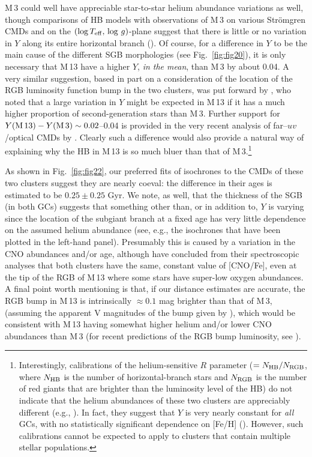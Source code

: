 \documentclass[12pt,preprint]{aastex}
\newcommand\teff{{T_{\rm eff}}}
\begin{document}
M$\,$3 could well have appreciable star-to-star helium abundance variations as
well, though comparisons of HB models with observations of M$\,$3 on various
Str\"omgren CMDs and on the $(\log\teff,\,\log\,g)$-plane suggest that there is
little or no variation in $Y$ along its entire horizontal branch
(\citealt{cgs09}).  Of course, for a difference in $Y$ to be the main cause of
the different SGB morphologies (see Fig.~\ref{fig:fig20}), it is only necessary
that M$\,$13 have a higher $Y$, {\it in the mean}, than M$\,$3 by about 0.04.  A
very similar suggestion, based in part on a consideration of the location of the
RGB luminosity function bump in the two clusters, was put forward by 
\citet{cd05}, who noted that a large variation in $Y$ might be expected in
M$\,$13 if it has a much higher proportion of second-generation stars than
M$\,$3.  Further support for $Y({\rm M}\,13) - Y({\rm M}\,3) \sim 0.02$--0.04 is
provided in the very recent analysis of far--$uv$/optical CMDs by \citet{dsf13}.
Clearly such a difference would also provide a natural way of explaining why the
HB in M$\,$13 is so much bluer than that of M$\,$3.\footnote{Interestingly,
calibrations of the helium-sensitive $R$ parameter ($= N_{\rm HB}/N_{\rm RGB}$,
where $N_{\rm HB}$ is the number of horizontal-branch stars and $N_{\rm RGB}$
is the number of red giants that are brighter than the luminosity level of the
HB) do not indicate that the helium abundances of these two clusters are
appreciably different (e.g., \citealt[also see \citealt{sgl10}]{sq00}).  In
fact, they suggest that $Y$ is very nearly constant for {\it all} GCs, with no
statistically significant dependence on [Fe/H] (\citealt{src04}).  However, such
calibrations cannot be expected to apply to clusters that contain multiple
stellar populations.}

As shown in Fig.~\ref{fig:fig22}, our preferred fits of isochrones to the CMDs
of these two clusters suggest they are nearly coeval: the difference in their
ages is estimated to be $0.25 \pm 0.25$ Gyr.  We note, as well, that the
thickness of the SGB (in both GCs) suggests that something other than, or in
addition to, $Y$ is varying since the location of the subgiant branch at a fixed
age has very little dependence on the assumed helium abundance (see, e.g., the
isochrones that have been plotted in the left-hand panel).  Presumably this is
caused by a variation in the CNO abundances and/or age, although
\citet{cm05a} have concluded from their spectroscopic analyses that both
clusters have the same, constant value of [CNO/Fe], even at the tip of the RGB
of M$\,$13 where some stars have super-low oxygen abundances.  A final point 
worth mentioning is that, if our distance estimates are accurate, the RGB bump
in M$\,$13 is intrinsically $\approx 0.1$ mag brighter than that of M$\,$3,
(assuming the apparent V magnitudes of the bump given by \citealt{ngp13}),
which would be consistent with M$\,$13 having somewhat higher helium and/or
lower CNO abundances than M$\,$3 (for recent predictions of the RGB bump
luminosity, see \citealt{van13}). 
\end{document}
